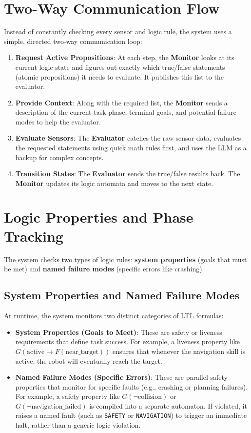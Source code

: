 \documentclass[11pt,a4paper]{article}
\begin{document}
\section{Two-Way Communication Flow}

Instead of constantly checking every sensor and logic rule, the system uses a simple, directed two-way communication loop:

\begin{enumerate}
    \item \textbf{Request Active Propositions}: At each step, the \textbf{Monitor} looks at its current logic state and figures out exactly which true/false statements (atomic propositions) it needs to evaluate. It publishes this list to the evaluator.
    \item \textbf{Provide Context}: Along with the required list, the \textbf{Monitor} sends a description of the current task phase, terminal goals, and potential failure modes to help the evaluator.
    \item \textbf{Evaluate Sensors}: The \textbf{Evaluator} catches the raw sensor data, evaluates the requested statements using quick math rules first, and uses the LLM as a backup for complex concepts.
    \item \textbf{Transition States}: The \textbf{Evaluator} sends the true/false results back. The \textbf{Monitor} updates its logic automata and moves to the next state.
\end{enumerate}

\section{Logic Properties and Phase Tracking}

The system checks two types of logic rules: \textbf{system properties} (goals that must be met) and \textbf{named failure modes} (specific errors like crashing).

\subsection{System Properties and Named Failure Modes}
At runtime, the system monitors two distinct categories of LTL formulas:
\begin{itemize}
    \item \textbf{System Properties (Goals to Meet)}: These are safety or liveness requirements that define task success. For example, a liveness property like $G(\text{active} \rightarrow F(\text{near\_target}))$ ensures that whenever the navigation skill is active, the robot will eventually reach the target.
    \item \textbf{Named Failure Modes (Specific Errors)}: These are parallel safety properties that monitor for specific faults (e.g., crashing or planning failures). For example, a safety property like $G(\neg\text{collision})$ or $G(\neg\text{navigation\_failed})$ is compiled into a separate automaton. If violated, it raises a named fault (such as \texttt{SAFETY} or \texttt{NAVIGATION}) to trigger an immediate halt, rather than a generic logic violation.
\end{itemize}
\end{document}

